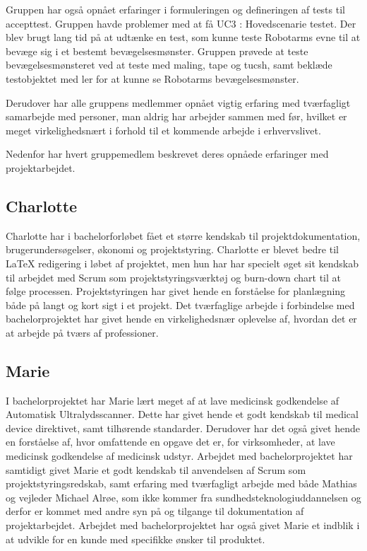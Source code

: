 Gruppen har også opnået erfaringer i formuleringen og defineringen af tests til accepttest. Gruppen havde problemer med at få UC3 : Hovedscenarie testet. Der blev brugt lang tid på at udtænke en test, som kunne teste Robotarms evne til at bevæge sig i et bestemt bevægelsesmønster. Gruppen prøvede at teste bevægelsesmønsteret ved at teste med maling, tape og tucsh, samt beklæde testobjektet med ler for at kunne se Robotarms bevægelsesmønster. 

Derudover har alle gruppens medlemmer opnået vigtig erfaring med tværfagligt samarbejde med personer, man aldrig har arbejder sammen med før, hvilket er meget virkelighedsnært i forhold til et kommende arbejde i erhvervslivet.

Nedenfor har hvert gruppemedlem beskrevet deres opnåede erfaringer med projektarbejdet. 

\subsection{Charlotte}
Charlotte har i bachelorforløbet fået et større kendskab til projektdokumentation, brugerundersøgelser, økonomi og projektstyring. Charlotte er blevet bedre til LaTeX redigering i løbet af projektet, men hun har har specielt øget sit kendskab til arbejdet med Scrum som projektstyringsværktøj og burn-down chart til at følge processen. Projektstyringen har givet hende en forståelse for planlægning både på langt og kort sigt i et projekt. Det tværfaglige arbejde i forbindelse med bachelorprojektet har givet hende en virkelighedsnær oplevelse af, hvordan det er at arbejde på tværs af professioner. 

\subsection{Marie}
I bachelorprojektet har Marie lært meget af at lave medicinsk godkendelse af Automatisk Ultralydsscanner. Dette har givet hende et godt kendskab til medical device direktivet, samt tilhørende standarder. Derudover har det også givet hende en forståelse af, hvor omfattende en opgave det er, for virksomheder, at lave medicinsk godkendelse af medicinsk udstyr. Arbejdet med bachelorprojektet har samtidigt givet Marie et godt kendskab til anvendelsen af Scrum som projektstyringsredskab, samt erfaring med tværfagligt arbejde med både Mathias og vejleder Michael Alrøe, som ikke kommer fra sundhedsteknologiuddannelsen og derfor er kommet med andre syn på og tilgange til dokumentation af projektarbejdet. Arbejdet med bachelorprojektet har også givet Marie et indblik i at udvikle for en kunde med specifikke ønsker til produktet. 

